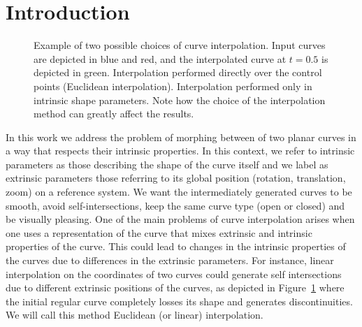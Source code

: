 \documentclass{ipol}
\newcommand{\chapFiveDir}{images/chapter_05a}
\begin{document}
\section{Introduction}
%
\begin{figure}[h]
	\centering
	\caption{Example of two possible choices of curve interpolation. Input curves are depicted in blue and red, and the interpolated curve at $t=0.5$ is depicted in green. \protect{} Interpolation performed directly over the control points (Euclidean interpolation). \protect{} Interpolation performed only in intrinsic shape parameters. Note how the choice of the interpolation method can greatly affect the results.}
	\label{fig:image_interpolation:curve_interpolation:example}
\end{figure}
%
In this work we address the problem of morphing between of two planar curves in a way that respects their intrinsic properties. In this context, we refer to intrinsic parameters as those describing the shape of the curve itself and we label as extrinsic parameters those referring to its global position (rotation, translation, zoom) on a reference system. We want the intermediately generated curves to be smooth, avoid self-intersections, keep the same curve type (open or closed) and be visually pleasing. 
%
One of the main problems of curve interpolation arises when one uses a representation of the curve that mixes extrinsic and intrinsic properties of the curve. This could lead to changes in the intrinsic properties of the curves due to differences in the extrinsic parameters. For instance, linear interpolation on the coordinates of two curves could generate self intersections due to different extrinsic positions of the curves, as depicted in \mbox{Figure \ref{fig:image_interpolation:curve_interpolation:example}} where the initial regular curve completely losses its shape and generates discontinuities. We will call this method Euclidean (or linear) interpolation.\\
\end{document}
